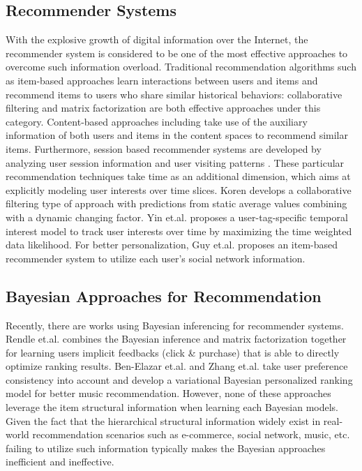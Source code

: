 \subsection{Recommender Systems}

With the explosive growth of digital information over the Internet, the recommender system is considered to be one of the most effective approaches to overcome such information overload. Traditional recommendation algorithms such as item-based approaches learn interactions between users and items and recommend items to users who share similar historical behaviors: collaborative filtering \cite{Sarwar:2001:ICF:371920.372071,Su:2009:SCF:1592474.1722966} and matrix factorization \cite{Rendle:2010:FPM} are both effective approaches under this category.  Content-based approaches including \cite{2011rsh..book...73L,Liu:2011,Yuan:2015} take use of the auxiliary information of both users and items in the content spaces to recommend similar items.  Furthermore, session based recommender systems are developed by analyzing user session information and user visiting patterns \cite{Gultekin_acollaborative,Tang_review:2013}. These particular recommendation techniques take time as an additional dimension, which aims at explicitly modeling user interests over time slices.  Koren \cite{Koren:2010} develops a collaborative filtering type of approach with predictions from static average values combining with a dynamic changing factor. Yin et.al. \cite{Yin:2011} proposes a user-tag-specific temporal interest model to track user interests over time by maximizing the time weighted data likelihood.  For better personalization, Guy et.al. \cite{Guy:2009} proposes an item-based recommender system to utilize each user's social network information. 

\subsection{Bayesian Approaches for Recommendation}

Recently, there are works using Bayesian inferencing for recommender systems.  Rendle et.al. \cite{rendle2009bpr} combines the Bayesian inference and matrix factorization together for learning users implicit feedbacks (click \& purchase) that is able to directly optimize ranking results. Ben-Elazar et.al. \cite{Ben-Elazar:2017} and Zhang et.al. \cite{zhang2007efficient} take user preference consistency into account and develop a variational Bayesian personalized ranking model for better music recommendation.  However, none of these approaches leverage the item structural information when learning each Bayesian models.  Given the fact that the hierarchical structural information widely exist in real-world recommendation scenarios such as e-commerce, social network, music, etc. failing to utilize such information typically makes the Bayesian approaches inefficient and ineffective.  

